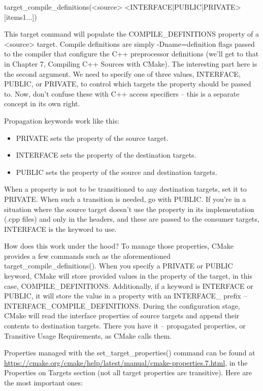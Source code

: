 \begin{shell}
target_compile_definitions(<source> <INTERFACE|PUBLIC|PRIVATE> [items1...])
\end{shell}

This target command will populate the COMPILE\_DEFINITIONS property of a <source> target. Compile definitions are simply -Dname=definition flags passed to the compiler that configure the C++ preprocessor definitions (we’ll get to that in Chapter 7, Compiling C++ Sources with CMake). The interesting part here is the second argument. We need to specify one of three values, INTERFACE, PUBLIC, or PRIVATE, to control which targets the property should be passed to. Now, don’t confuse these with C++ access specifiers – this is a separate concept in its own right.

Propagation keywords work like this:

\begin{itemize}
\item
PRIVATE sets the property of the source target.

\item
INTERFACE sets the property of the destination targets.

\item
PUBLIC sets the property of the source and destination targets.
\end{itemize}

When a property is not to be transitioned to any destination targets, set it to PRIVATE. When such a transition is needed, go with PUBLIC. If you’re in a situation where the source target doesn’t use the property in its implementation (.cpp files) and only in the headers, and these are passed to the consumer targets, INTERFACE is the keyword to use.

How does this work under the hood? To manage those properties, CMake provides a few commands such as the aforementioned target\_compile\_definitions(). When you specify a PRIVATE or PUBLIC keyword, CMake will store provided values in the property of the target, in this case, COMPILE\_DEFINITIONS. Additionally, if a keyword is INTERFACE or PUBLIC, it will store the value in a property with an INTERFACE\_ prefix – INTERFACE\_COMPILE\_DEFINITIONS. During the configuration stage, CMake will read the interface properties of source targets and append their contents to destination targets. There you have it – propagated properties, or Transitive Usage Requirements, as CMake calls them.

Properties managed with the set\_target\_properties() command can be found at \url{https://cmake.org/cmake/help/latest/manual/cmake-properties.7.html}, in the Properties on Targets section (not all target properties are transitive). Here are the most important ones:

